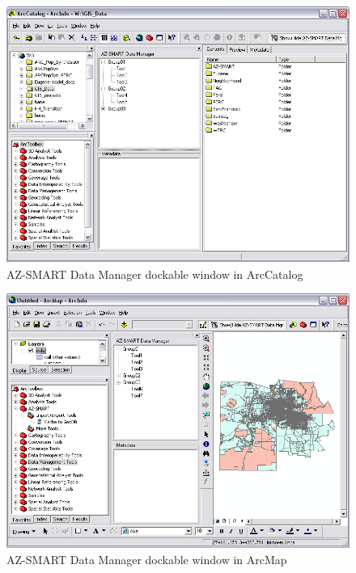 \begin{figure}[h]
\begin{center}
\includegraphics[scale=0.5]{figures/AZ-SMART_DataManager_in_ArcCatalog.png}
\caption{AZ-SMART Data Manager dockable window in ArcCatalog}
\label{figCatalog}
\end{center}
\end{figure}

\begin{figure}[h]
\begin{center}
\includegraphics[scale=0.5]{figures/AZ-SMART_DataManager_in_ArcMap.png}
\caption{AZ-SMART Data Manager dockable window in ArcMap}
\label{figMap}
\end{center}
\end{figure}

